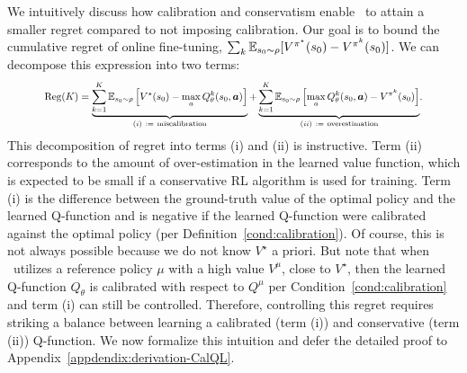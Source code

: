 
 We intuitively discuss how calibration and conservatism enable \methodname\ to attain a smaller regret compared to not imposing calibration. Our goal is to bound the cumulative regret of online fine-tuning, ${\sum_{k} \mathbb{E}_{s_0 \sim \rho}[V^{\pi^\star}(s_0) - V^{\pi^k}(s_0)]}$. We can decompose this expression into two terms: 
\vspace{-0.05cm}
\begin{align}
    \resizebox{.87\textwidth}{!}{$\regret(K) = \underbrace{\sum_{k=1}^K \mathbb{E}_{\bs_0 \sim \rho} \brac{V^{\star}(\bs_0) -\max_a {Q}_{\theta}^k(\bs_0,\mathbf{a})}}_{(i) ~:=~ \text{miscalibration}}
    +\underbrace{\sum_{k=1}^K \mathbb{E}_{\bs_0 \sim \rho} \brac{ \max_a {Q}_{\theta}^k(\bs_0,\mathbf{a}) - V^{\pi^{k}}(\bs_0)}}_{(ii) ~:=~ \text{overestimation}}$.}
\label{eq:regret-decomposition}
\end{align}
This decomposition of regret into terms (i) and (ii) is instructive. Term (ii) corresponds to the amount of over-estimation in the learned value function, which is expected to be small if a conservative RL algorithm is used for training. Term (i) is the difference between the ground-truth value of the optimal policy and the learned Q-function and is negative if the learned Q-function were calibrated against the optimal policy (per Definition~\ref{cond:calibration}). Of course, this is not always possible because we do not know $V^\star$ a priori. But note that when \methodname\ utilizes a reference policy $\mu$ with a high value $V^\mu$, close to $V^\star$, then the learned Q-function $Q_\theta$ is calibrated with respect to $Q^\mu$ per Condition~\ref{cond:calibration} and term (i) can still be controlled. Therefore, controlling this regret requires striking a balance between learning a calibrated (term (i)) and conservative (term (ii)) Q-function. We now formalize this intuition and defer the detailed proof to Appendix~\ref{appdendix:derivation-CalQL}. 



